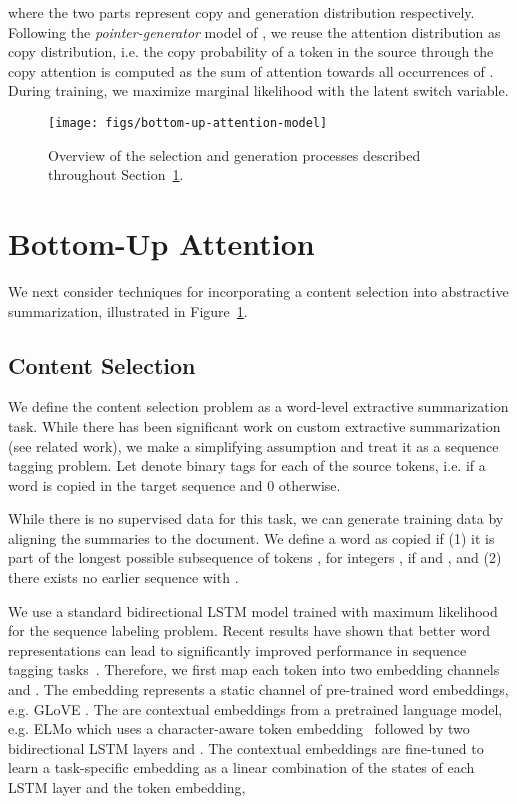 \documentclass[11pt,a4paper]{article}
\begin{document}
\noindent where the two parts represent copy and generation distribution respectively.
Following the \emph{pointer-generator} model of \citet{see2017get}, we reuse the attention  distribution as copy distribution, i.e. the copy probability of a token in the source  through the copy attention is computed as the sum of attention towards all occurrences of . During training, we maximize marginal likelihood with the latent switch variable. 




\begin{figure}[t]
\centering
\texttt{[image: figs/bottom-up-attention-model]}
\caption{Overview of the selection and generation processes described throughout Section~\ref{sec:bua}.}
\label{fig:bua}
\end{figure}


\section{Bottom-Up Attention}
\label{sec:bua}

We next consider techniques for incorporating a content selection into abstractive summarization, illustrated in Figure~\ref{fig:bua}. 



\subsection{Content Selection}
\label{sec:content}

We define the content selection problem as a word-level extractive summarization task. While there has been significant work on custom extractive summarization (see related work), we make a simplifying assumption and treat it as a sequence tagging problem. Let  denote binary tags for each of the source tokens, i.e.  if a word is copied in the target sequence and 0 otherwise. 

While there is no supervised data for this task, 
we can generate training data by aligning the summaries 
to the document. We define a word  as copied if (1) it is part of the longest possible subsequence of tokens , for integers , if  and , and (2) there exists no earlier sequence  with .

We use a standard bidirectional LSTM model trained with maximum likelihood for the sequence labeling problem. Recent results have shown that better word representations can lead to significantly improved performance in sequence tagging tasks~\citep{peters2017semi}. Therefore, we first map each token  into two embedding channels  and . The  embedding represents a static channel of pre-trained word embeddings, e.g. GLoVE \citep{pennington2014glove}. The  are contextual embeddings from a pretrained language model, e.g. ELMo  \citep{peters2018deep} which uses a character-aware token embedding~\citep{kim2016character} followed by two bidirectional LSTM layers  and . The contextual embeddings are fine-tuned to learn a task-specific embedding  as a linear combination of the states of each LSTM layer and the token embedding,
\end{document}
